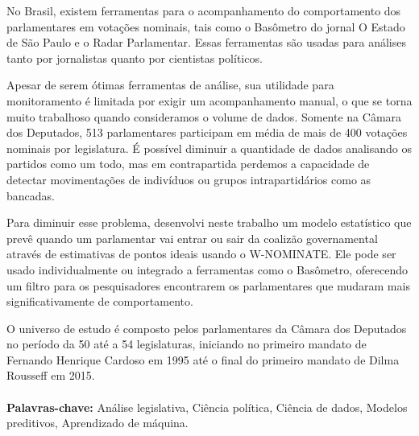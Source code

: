 No Brasil, existem ferramentas para o acompanhamento do comportamento dos
parlamentares em votações nominais, tais como o Basômetro do jornal O Estado de
São Paulo e o Radar Parlamentar. Essas ferramentas são usadas para análises
tanto por jornalistas quanto por cientistas políticos.

Apesar de serem ótimas ferramentas de análise, sua utilidade para monitoramento
é limitada por exigir um acompanhamento manual, o que se torna muito trabalhoso
quando consideramos o volume de dados. Somente na Câmara dos Deputados, 513
parlamentares participam em média de mais de 400 votações nominais por
legislatura. É possível diminuir a quantidade de dados analisando os partidos
como um todo, mas em contrapartida perdemos a capacidade de detectar
movimentações de indivíduos ou grupos intrapartidários como as bancadas.


Para diminuir esse problema, desenvolvi neste trabalho um modelo estatístico
que prevê quando um parlamentar vai entrar ou sair da coalizão governamental
através de estimativas de pontos ideais usando o W-NOMINATE. Ele pode ser usado
individualmente ou integrado a ferramentas como o Basômetro, oferecendo um
filtro para os pesquisadores encontrarem os parlamentares que mudaram mais
significativamente de comportamento.

O universo de estudo é composto pelos parlamentares da Câmara dos Deputados no
período da 50\textordfeminine{} até a 54\textordfeminine{} legislaturas,
iniciando no primeiro mandato de Fernando Henrique Cardoso em 1995 até o final
do primeiro mandato de Dilma Rousseff em 2015.
\\
\\
\textbf{Palavras-chave:} Análise legislativa, Ciência política, Ciência de
dados, Modelos preditivos, Aprendizado de máquina.

